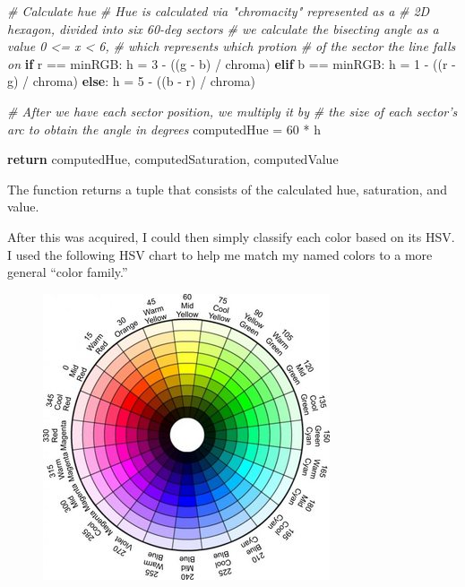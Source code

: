\documentclass[11pt]{article}
\newenvironment{Shaded}{}{}
\newcommand{\DecValTok}[1]{\textcolor[rgb]{0.25,0.63,0.44}{{#1}}}
\newcommand{\CommentTok}[1]{\textcolor[rgb]{0.38,0.63,0.69}{\textit{{#1}}}}
\newcommand{\NormalTok}[1]{{#1}}
\newcommand{\ControlFlowTok}[1]{\textcolor[rgb]{0.00,0.44,0.13}{\textbf{{#1}}}}
\newcommand{\OperatorTok}[1]{\textcolor[rgb]{0.40,0.40,0.40}{{#1}}}
\begin{document}
\begin{Shaded}
\begin{Highlighting}[]
    \CommentTok{# Calculate hue}
    \CommentTok{# Hue is calculated via "chromacity" represented as a }
    \CommentTok{#    2D hexagon, divided into six 60-deg sectors}
    \CommentTok{# we calculate the bisecting angle as a value 0 <= x < 6, }
    \CommentTok{#    which represents which protion}
    \CommentTok{# of the sector the line falls on}
    \ControlFlowTok{if}\NormalTok{ r }\OperatorTok{==}\NormalTok{ minRGB:}
\NormalTok{        h }\OperatorTok{=} \DecValTok{3} \OperatorTok{-}\NormalTok{ ((g }\OperatorTok{-}\NormalTok{ b) }\OperatorTok{/}\NormalTok{ chroma)}
    \ControlFlowTok{elif}\NormalTok{ b }\OperatorTok{==}\NormalTok{ minRGB:}
\NormalTok{        h }\OperatorTok{=} \DecValTok{1} \OperatorTok{-}\NormalTok{ ((r }\OperatorTok{-}\NormalTok{ g) }\OperatorTok{/}\NormalTok{ chroma)}
    \ControlFlowTok{else}\NormalTok{:}
\NormalTok{        h }\OperatorTok{=} \DecValTok{5} \OperatorTok{-}\NormalTok{ ((b }\OperatorTok{-}\NormalTok{ r) }\OperatorTok{/}\NormalTok{ chroma)}

    \CommentTok{# After we have each sector position, we multiply it by }
    \CommentTok{# the size of each sector's arc to obtain the angle in degrees}
\NormalTok{    computedHue }\OperatorTok{=} \DecValTok{60} \OperatorTok{*}\NormalTok{ h}

    \ControlFlowTok{return}\NormalTok{ computedHue, computedSaturation, computedValue}
\end{Highlighting}
\end{Shaded}

The function returns a tuple that consists of the calculated hue,
saturation, and value.

After this was acquired, I could then simply classify each color based
on its HSV. I used the following HSV chart to help me match my named
colors to a more general ``color family.''

\begin{figure}
\centering
\includegraphics{PKjgfFXm.png}
\end{figure}
\end{document}
